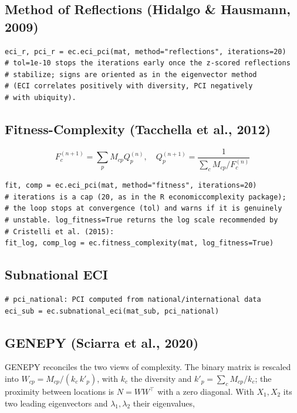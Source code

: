 \documentclass[12pt, a4paper]{article}
\begin{document}
\subsection{Method of Reflections (Hidalgo \& Hausmann, 2009)}

\begin{lstlisting}[caption={Method of Reflections}]
eci_r, pci_r = ec.eci_pci(mat, method="reflections", iterations=20)
# tol=1e-10 stops the iterations early once the z-scored reflections
# stabilize; signs are oriented as in the eigenvector method
# (ECI correlates positively with diversity, PCI negatively
# with ubiquity).
\end{lstlisting}

\subsection{Fitness-Complexity (Tacchella et al., 2012)}

\[
  F_c^{(n+1)} = \sum_p M_{cp} Q_p^{(n)}, \quad
  Q_p^{(n+1)} = \frac{1}{\sum_c M_{cp} / F_c^{(n)}}
\]

\begin{lstlisting}[caption={Fitness-Complexity}]
fit, comp = ec.eci_pci(mat, method="fitness", iterations=20)
# iterations is a cap (20, as in the R economiccomplexity package);
# the loop stops at convergence (tol) and warns if it is genuinely
# unstable. log_fitness=True returns the log scale recommended by
# Cristelli et al. (2015):
fit_log, comp_log = ec.fitness_complexity(mat, log_fitness=True)
\end{lstlisting}

\subsection{Subnational ECI}

\begin{lstlisting}[caption={Subnational ECI with external PCI}]
# pci_national: PCI computed from national/international data
eci_sub = ec.subnational_eci(mat_sub, pci_national)
\end{lstlisting}

\subsection{GENEPY (Sciarra et al., 2020)}

\begin{sloppypar}
GENEPY reconciles the two views of complexity. The binary matrix is
rescaled into $W_{cp} = M_{cp} / (k_c\,k'_p)$, with $k_c$ the diversity
and $k'_p = \sum_c M_{cp}/k_c$; the proximity between locations is
$N = WW^{\top}$ with a zero diagonal. With $X_1, X_2$ its two leading
eigenvectors and $\lambda_1, \lambda_2$ their eigenvalues,
\end{sloppypar}
\end{document}
